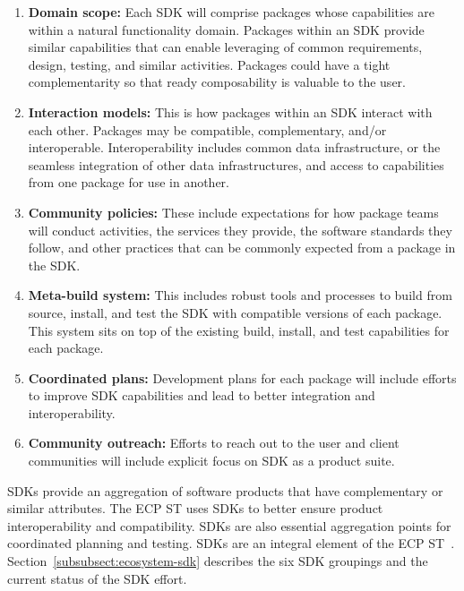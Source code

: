 \begin{enumerate}
	\item \textbf{Domain scope:} Each SDK will comprise packages whose capabilities are within a natural functionality domain. Packages within an SDK provide similar capabilities that can enable leveraging of common requirements, design, testing, and similar activities. Packages could have a tight complementarity so that ready composability is valuable to the user.
	\item \textbf{Interaction models:} This is how packages within an SDK interact with each other. Packages may be compatible, complementary, and/or interoperable. Interoperability includes common data infrastructure, or the seamless integration of other data infrastructures, and access to capabilities from one package for use in another.
	\item \textbf{Community policies:} These include expectations for how package teams will conduct activities, the services they provide, the software standards they follow, and other practices that can be commonly expected from a package in the SDK.
	\item \textbf{Meta-build system:} This includes robust tools and processes to build from source, install, and test the SDK with compatible versions of each package. This system sits on top of the existing build, install, and test capabilities for each package.
	\item \textbf{Coordinated plans:} Development plans for each package will include efforts to improve SDK capabilities and lead to better integration and interoperability.
	\item \textbf{Community outreach:} Efforts to reach out to the user and client communities will include explicit focus on SDK as a product suite.
\end{enumerate}
	
SDKs provide an aggregation of software products that have complementary or similar attributes. The ECP ST uses SDKs to better ensure product interoperability and compatibility.  SDKs are also essential aggregation points for coordinated planning and testing. SDKs are an integral element of the ECP ST~\cite{Heroux-SDK-Podcast}.  Section~\ref{subsubsect:ecosystem-sdk} describes the six SDK groupings and the current status of the SDK effort.

